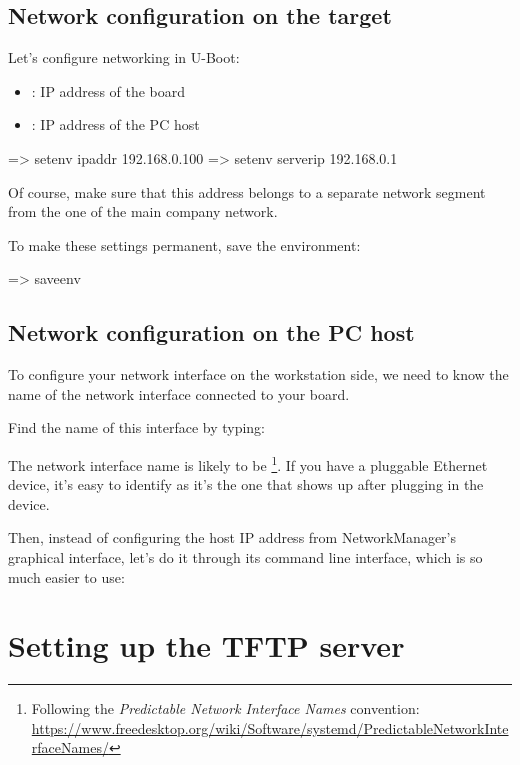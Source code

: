 \subsection{Network configuration on the target}

Let's configure networking in U-Boot:

\begin{itemize}
  \item {}: IP address of the board
  \item {}: IP address of the PC host
\end{itemize}

\begin{ubootinput}
=> setenv ipaddr 192.168.0.100
=> setenv serverip 192.168.0.1
\end{ubootinput}

Of course, make sure that this address belongs to a separate network
segment from the one of the main company network.

To make these settings permanent, save the environment:

\begin{ubootinput}
=> saveenv
\end{ubootinput}

\subsection{Network configuration on the PC host}

To configure your network interface on the workstation side, we need
to know the name of the network interface connected to your board.

Find the name of this interface by typing:

The network interface name is likely to be
\footnote{Following the {\em Predictable Network Interface
Names} convention:
\url{https://www.freedesktop.org/wiki/Software/systemd/PredictableNetworkInterfaceNames/}}.
If you have a pluggable Ethernet device, it's easy to identify as it's
the one that shows up after plugging in the device.

Then, instead of configuring the host IP address from NetworkManager's
graphical interface, let's do it through its command line interface,
which is so much easier to use:


\section{Setting up the TFTP server}

